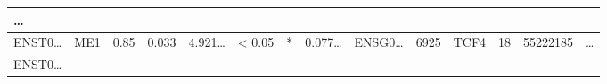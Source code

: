 \documentclass[
]{article}
\begin{document}
\begin{longtable}[]{@{}llllllllllllll@{}}
\begin{minipage}[b]{0.02\columnwidth}
\ldots{}\strut
\end{minipage}\tabularnewline
\midrule
\endhead
\begin{minipage}[t]{0.05\columnwidth}\raggedright
ENST0\ldots{}\strut
\end{minipage} & \begin{minipage}[t]{0.04\columnwidth}\raggedright
ME1\strut
\end{minipage} & \begin{minipage}[t]{0.04\columnwidth}\raggedright
0.85\strut
\end{minipage} & \begin{minipage}[t]{0.04\columnwidth}\raggedright
0.033\strut
\end{minipage} & \begin{minipage}[t]{0.05\columnwidth}\raggedright
4.921\ldots{}\strut
\end{minipage} & \begin{minipage}[t]{0.05\columnwidth}\raggedright
\textless{} 0.05\strut
\end{minipage} & \begin{minipage}[t]{0.03\columnwidth}\raggedright
*\strut
\end{minipage} & \begin{minipage}[t]{0.05\columnwidth}\raggedright
0.077\ldots{}\strut
\end{minipage} & \begin{minipage}[t]{0.05\columnwidth}\raggedright
ENSG0\ldots{}\strut
\end{minipage} & \begin{minipage}[t]{0.05\columnwidth}\raggedright
6925\strut
\end{minipage} & \begin{minipage}[t]{0.05\columnwidth}\raggedright
TCF4\strut
\end{minipage} & \begin{minipage}[t]{0.05\columnwidth}\raggedright
18\strut
\end{minipage} & \begin{minipage}[t]{0.05\columnwidth}\raggedright
55222185\strut
\end{minipage} & \begin{minipage}[t]{0.02\columnwidth}\raggedright
\ldots{}\strut
\end{minipage}\tabularnewline
\begin{minipage}[t]{0.05\columnwidth}\raggedright
ENST0\ldots{}\strut
\end{minipage} & \begin{minipage}[t]{0.04\columnwidth}\raggedright

\end{minipage}
\end{longtable}
\end{document}
